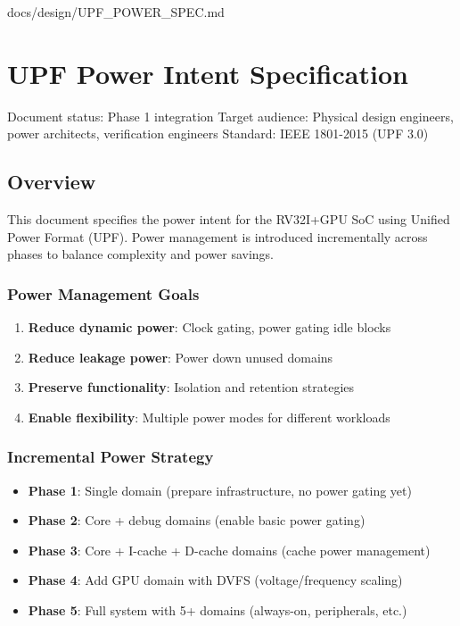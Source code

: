 \begin{relocated}{docs/design/UPF_POWER_SPEC.md}
\section{UPF Power Intent Specification}

Document status: Phase 1 integration Target audience: Physical design
engineers, power architects, verification engineers Standard: IEEE
1801-2015 (UPF 3.0)

\subsection{Overview}\label{ds:ch:upf-power-spec:overview}

This document specifies the power intent for the RV32I+GPU SoC using
Unified Power Format (UPF). Power management is introduced incrementally
across phases to balance complexity and power savings.

\subsubsection{Power Management Goals}\label{ds:ch:upf-power-spec:power-management-goals}

\begin{enumerate}
\def\labelenumi{\arabic{enumi}.}
\tightlist
\item
  \textbf{Reduce dynamic power}: Clock gating, power gating idle blocks
\item
  \textbf{Reduce leakage power}: Power down unused domains
\item
  \textbf{Preserve functionality}: Isolation and retention strategies
\item
  \textbf{Enable flexibility}: Multiple power modes for different
  workloads
\end{enumerate}

\subsubsection{Incremental Power Strategy}\label{ds:ch:upf-power-spec:incremental-power-strategy}

\begin{itemize}
\tightlist
\item
  \textbf{Phase 1}: Single domain (prepare infrastructure, no power
  gating yet)
\item
  \textbf{Phase 2}: Core + debug domains (enable basic power gating)
\item
  \textbf{Phase 3}: Core + I-cache + D-cache domains (cache power
  management)
\item
  \textbf{Phase 4}: Add GPU domain with DVFS
  (voltage/\allowbreak{}frequency scaling)
\item
  \textbf{Phase 5}: Full system with 5+ domains (always-on, peripherals,
  etc.)
\end{itemize}


\end{relocated}
